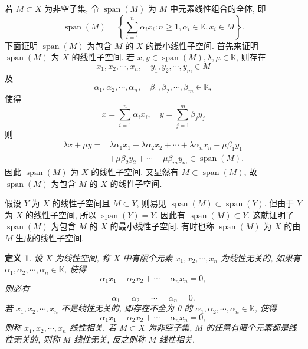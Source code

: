 \documentclass[openany]{ctexbook}
\theoremstyle{kaiti}
\newtheorem{definition}{定义}[section]
\theoremstyle{normal}
\begin{document}
若 $M \subset X$ 为非空子集, 令 $\operatorname{span}(M)$ 为 $M$ 中元素线性组合的全体, 即
\begin{equation}
  \operatorname{span}(M)=\left\{\sum_{i=1}^n \alpha_{i} x_{i}: n \geqslant 1, \alpha_{i} \in \mathbb{K}, x_{i} \in M\right\}.
\end{equation}
下面证明 $\operatorname{span}(M)$ 为包含 $M$ 的 $X$ 的最小线性子空间. 首先来证明 $\operatorname{span}(M)$ 为 $X$ 的线性子空间. 若 $x, y \in \operatorname{span}(M), \lambda, \mu \in \mathbb{K}$, 则存在
$$
x_1, x_2, \cdots, x_n, \quad y_1, y_2, \cdots, y_m \in M
$$
及
$$
\alpha_1, \alpha_2, \cdots, \alpha_n, \quad \beta_1, \beta_2, \cdots, \beta_m \in \mathbb{K},
$$
使得
$$
x=\sum_{i=1}^n \alpha_{i} x_{i}, \quad y=\sum_{j=1}^m \beta_{j} y_{j}
$$
则
$$
\begin{aligned}
\lambda x+\mu y=& \lambda \alpha_1 x_1+\lambda \alpha_2 x_2+\cdots+\lambda \alpha_n x_n+\mu \beta_1 y_1 \\
&+\mu \beta_2 y_2+\cdots+\mu \beta_m y_m \in \operatorname{span}(M).
\end{aligned}
$$
因此 $\operatorname{span}(M)$ 为 $X$ 的线性子空间. 又显然有 $M \subset \operatorname{span}(M)$, 故 $\operatorname{span}(M)$ 为包含 $M$ 的 $X$ 的线性子空间.

假设 $Y$ 为 $X$ 的线性子空间且 $M \subset Y$, 则易见 $\operatorname{span}(M) \subset \operatorname{span}(Y)$. 但由于 $Y$ 为 $X$ 的线性子空间, 所以 $\operatorname{span}(Y)=Y$. 因此有 $\operatorname{span}(M) \subset Y$. 这就证明了 $\operatorname{span}(M)$ 为包含 $M$ 的 $X$ 的最小线性子空间. 有时也称 $\operatorname{span}(M)$ 为 $X$ 的由 $M$ 生成的线性子空间.

\begin{definition}
设 $X$ 为线性空间, 称 $X$ 中有限个元素 $x_1, x_2, \cdots, x_n$ 为线性无关的, 如果有 $\alpha_1, \alpha_2, \cdots, \alpha_n \in \mathbb{K}$, 使得
$$
\alpha_1 x_1+\alpha_2 x_2+\cdots+\alpha_n x_n=0,
$$
则必有
$$
\alpha_1=\alpha_2=\cdots=\alpha_n=0.
$$
若 $x_1, x_2, \cdots, x_n$ 不是线性无关的, 即存在不全为 0 的 $\alpha_1, \alpha_2, \cdots, \alpha_n \in \mathbb{K}$, 使得
$$
\alpha_1 x_1+\alpha_2 x_2+\cdots+\alpha_n x_n=0,
$$
则称 $x_1, x_2, \cdots, x_n$ 线性相关. 若 $M \subset X$ 为非空子集, $M$ 的任意有限个元素都是线性无关的, 则称 $M$ 线性无关, 反之则称 $M$ 线性相关.
\end{definition}
\end{document}
